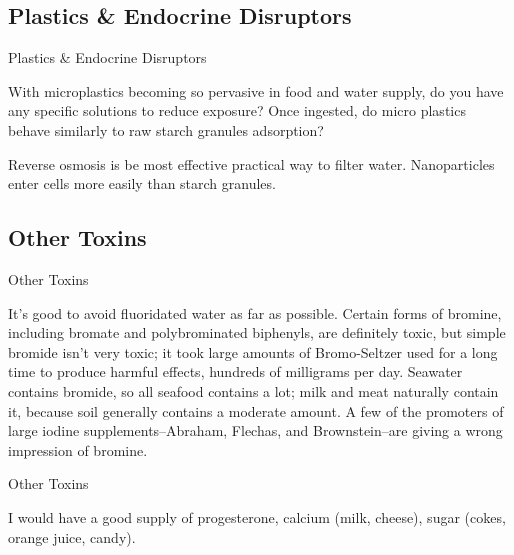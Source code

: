 \documentclass[11pt,oneside,openany,extrafontsizes]{memoir}
\begin{document}
\subsection{Plastics \& Endocrine Disruptors}

\begin{qaexchange}{Plastics \& Endocrine Disruptors}

    \begin{question}
        With microplastics becoming so pervasive in food and water supply, do you have any specific solutions to reduce exposure? Once ingested, do micro plastics behave similarly to raw starch granules adsorption?
    \end{question}

    \begin{answer}
      Reverse osmosis is be most effective practical way to filter water. Nanoparticles enter cells more easily than starch granules.
    \end{answer}
\end{qaexchange}

\subsection{Other Toxins}

\begin{standalonequote}{Other Toxins}

    \begin{answer}
        It's good to avoid fluoridated water as far as possible. Certain forms of bromine, including bromate and polybrominated biphenyls, are definitely toxic, but simple bromide isn't very toxic; it took large amounts of Bromo-Seltzer used for a long time to produce harmful effects, hundreds of milligrams per day. Seawater contains bromide, so all seafood contains a lot; milk and meat naturally contain it, because soil generally contains a moderate amount. A few of the promoters of large iodine supplements--Abraham, Flechas, and Brownstein--are giving a wrong impression of bromine. 
    \end{answer}
\end{standalonequote}

\begin{standalonequote}{Other Toxins}

    \begin{answer}
       I would have a good supply of progesterone, calcium (milk, cheese), sugar (cokes, orange juice, candy). 
    \end{answer}
\end{standalonequote}
\end{document}
